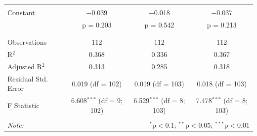 \begin{table}[!htbp]
\begin{tabular}{@{\extracolsep{5pt}}lccc}
  & & & \\ 
 Constant & $-$0.039 & $-$0.018 & $-$0.037 \\ 
  & p = 0.203 & p = 0.542 & p = 0.213 \\ 
  & & & \\ 
\hline \\[-1.8ex] 
Observations & 112 & 112 & 112 \\ 
R$^{2}$ & 0.368 & 0.336 & 0.367 \\ 
Adjusted R$^{2}$ & 0.313 & 0.285 & 0.318 \\ 
Residual Std. Error & 0.019 (df = 102) & 0.019 (df = 103) & 0.018 (df = 103) \\ 
F Statistic & 6.608$^{***}$ (df = 9; 102) & 6.529$^{***}$ (df = 8; 103) & 7.478$^{***}$ (df = 8; 103) \\ 
\hline 
\hline \\[-1.8ex] 
\textit{Note:}  & \multicolumn{3}{r}{$^{*}$p$<$0.1; $^{**}$p$<$0.05; $^{***}$p$<$0.01} \\ 
\end{tabular} 
\end{table}



